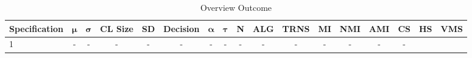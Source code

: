 \documentclass[12pt,a4paper,bibliography=totocnumbered,listof=totocnumbered]{scrartcl}
\begin{document}
\pagebreak


\begin{table}
	\centering
	\begin{tabular}{| l || c | c | c | c | c | c | c | c | c | c || c  |  c | c | c | c | c | }
		\toprule \toprule
		\textbf{Specification} &$\boldsymbol{\mu}$ & $\boldsymbol{\sigma}$ & \textbf{CL Size} & \textbf{SD} & \textbf{Decision} & $\boldsymbol{\alpha}$  &  $\boldsymbol{\tau}$  & \textbf{N} & \textbf{ALG} & \textbf{TRNS} &  \textbf{MI} & \textbf{NMI} &  \textbf{AMI} &  \textbf{CS} &  \textbf{HS } & \textbf{VMS}     \\
		\hline
		1 & -  & -& -& -& -& -& -& -& -& -& -& -& - & - \\
		\bottomrule
	\end{tabular}
	\caption{Overview Outcome }
\end{table}
\end{document}
